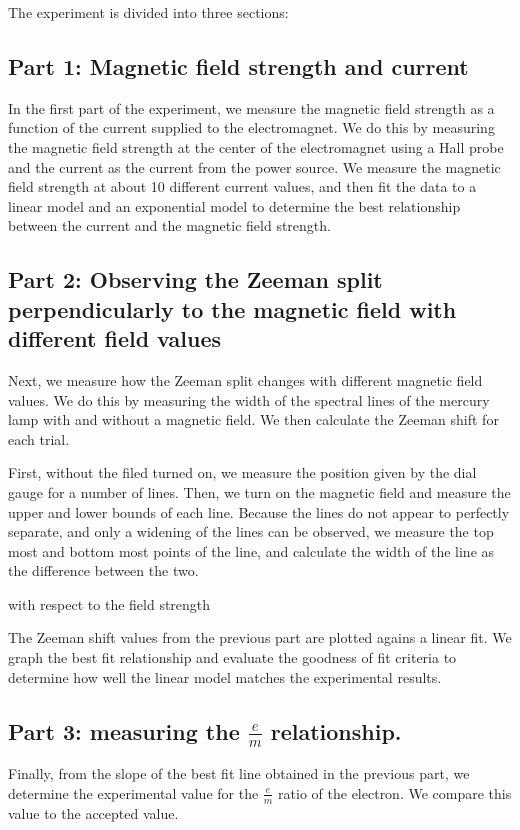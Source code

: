 The experiment is divided into three sections:

\subsection{Part 1: Magnetic field strength and current}
In the first part of the experiment, we measure the magnetic field strength as a function of the current supplied to the electromagnet. We do this by measuring the magnetic field strength at the center of the electromagnet using a Hall probe and the current as the current from the power source. We measure the magnetic field strength at about 10 different current values, and then fit the data to a linear model and an exponential model to determine the best relationship between the current and the magnetic field strength.

\subsection{Part 2: Observing the Zeeman split perpendicularly to the magnetic field with different field values}

Next, we measure how the Zeeman split changes with different magnetic field values.
We do this by measuring the width of the spectral lines of the mercury lamp with and without a magnetic field.
We then calculate the Zeeman shift for each trial.

First, without the filed turned on, we measure the position given by the dial gauge for a number of lines.
Then, we turn on the magnetic field and measure the upper and lower bounds of each line. Because
the lines do not appear to perfectly separate, and only a widening of the lines can be observed,
we measure the top most and bottom most points of the line, and calculate the width of the line as the difference between the two.


with respect to the field strength

The Zeeman shift values from the previous part are plotted agains a linear fit. We graph the best fit relationship and
evaluate the goodness of fit criteria to determine how well the linear model matches the experimental results.


\subsection{Part 3: measuring the $\frac{e}{m}$ relationship.}

Finally, from the slope of the best fit line obtained in the previous part, we determine the
experimental value for the $\frac{e}{m}$ ratio of the electron. We compare this value to the accepted value.

